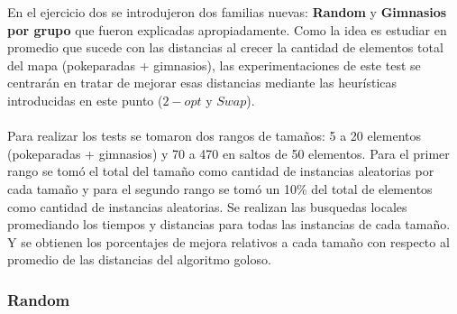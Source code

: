 \newpage

En el ejercicio dos se introdujeron dos familias nuevas: \textbf{Random} y \textbf{Gimnasios por grupo} que fueron explicadas apropiadamente. Como la idea es estudiar en promedio que sucede con las distancias al crecer la cantidad de elementos total del mapa (pokeparadas + gimnasios), las experimentaciones de este test se centrarán en tratar de mejorar esas distancias mediante las heurísticas introducidas en este punto ($2-opt$ y $Swap$).\\\\

Para realizar los tests se tomaron dos rangos de tamaños: 5 a 20 elementos (pokeparadas + gimnasios) y 70 a 470 en saltos de 50 elementos.
Para el primer rango se tomó el total del tamaño como cantidad de instancias aleatorias por cada tamaño y para el segundo rango se tomó un 10\% del total de elementos como cantidad de instancias aleatorias.
Se realizan las busquedas locales promediando los tiempos y distancias para todas las instancias de cada tamaño. Y se obtienen los porcentajes de mejora relativos a cada tamaño con respecto al promedio de las distancias del algoritmo goloso. 

\subsubsection*{Random}


\\\\

\begin{figure}[h] 
 \centering
       \label{fig:randomDist1}
    \label{fig:randomMejora1}
\end{figure}

